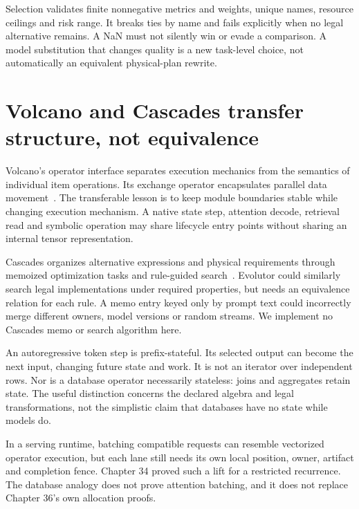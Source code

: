 \begin{center}\end{center}
Selection validates finite nonnegative metrics and weights, unique names,
resource ceilings and risk range. It breaks ties by name and fails explicitly
when no legal alternative remains. A NaN must not silently win or evade a
comparison. A model substitution that changes quality is a new task-level
choice, not automatically an equivalent physical-plan rewrite.

\section{Volcano and Cascades transfer structure, not equivalence}
\label{evod42:precedents}
Volcano's operator interface separates execution mechanics from the semantics
of individual item operations. Its exchange operator encapsulates parallel
data movement~\cite{evod42:volcano}. The transferable lesson is to keep module
boundaries stable while changing execution mechanism. A native state step,
attention decode, retrieval read and symbolic operation may share lifecycle
entry points without sharing an internal tensor representation.

Cascades organizes alternative expressions and physical requirements through
memoized optimization tasks and rule-guided search~\cite{evod42:cascades}.
Evolutor could similarly search legal implementations under required properties,
but needs an equivalence relation for each rule. A memo entry keyed only by
prompt text could incorrectly merge different owners, model versions or
random streams. We implement no Cascades memo or search algorithm here.

An autoregressive token step is prefix-stateful. Its selected output can become
the next input, changing future state and work. It is not an iterator over
independent rows. Nor is a database operator necessarily stateless: joins and
aggregates retain state. The useful distinction concerns the declared algebra
and legal transformations, not the simplistic claim that databases have no
state while models do.

In a serving runtime, batching compatible requests can resemble vectorized
operator execution, but each lane still needs its own local position, owner,
artifact and completion fence. Chapter 34 proved such a lift for a restricted
recurrence. The database analogy does not prove attention batching, and it does not replace
Chapter 36's own allocation proofs.

